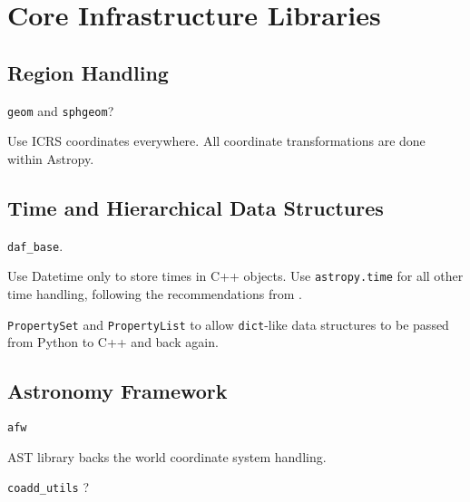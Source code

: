 \section{Core Infrastructure Libraries}

\subsection{Region Handling}

\texttt{geom} and \texttt{sphgeom}?

Use ICRS coordinates everywhere.
All coordinate transformations are done within Astropy.

\subsection{Time and Hierarchical Data Structures}

\texttt{daf\_base}.

Use Datetime only to store times in C++ objects.
Use \texttt{astropy.time} for all other time handling, following the recommendations from \citet{2016SPIE.9913E..0GJ}.

\texttt{PropertySet} and \texttt{PropertyList} to allow \texttt{dict}-like data structures to be passed from Python to C++ and back again.

\subsection{Astronomy Framework}
\label{sec:afw}
\texttt{afw}

AST library \citep{2016A&C....15...33B} backs the world coordinate system handling.

\texttt{coadd\_utils} ?
